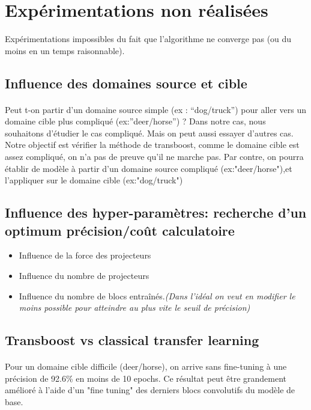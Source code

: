 \documentclass[11 pt]{article}
\begin{document}
\section{Expérimentations non réalisées}
Expérimentations impossibles du fait que l'algorithme ne converge pas (ou du moins en un temps raisonnable).
\subsection{Influence des domaines source et cible}
\paragraph{}Peut t-on partir d’un domaine source simple (ex : “dog/truck”) pour aller vers un domaine cible plus compliqué (ex:”deer/horse”) ? 
Dans notre cas, nous souhaitons d'étudier le cas compliqué. Mais on peut aussi essayer d'autres cas. Notre objectif est vérifier la méthode de transboost, comme le domaine cible est assez compliqué, on n'a pas de preuve qu'il ne marche pas. Par contre, on pourra établir de modèle à partir d'un domaine source compliqué (ex:"deer/horse"),et l'appliquer sur le domaine cible (ex:"dog/truck")
\subsection{Influence des hyper-paramètres: recherche d'un optimum précision/coût calculatoire}
\begin{itemize}
\item Influence de la force des projecteurs
\item Influence du nombre de projecteurs
\item Influence du nombre de blocs entraînés.\emph{(Dans l’idéal on veut en modifier le moins possible pour atteindre au plus vite le seuil de précision)}
\end{itemize}

\subsection{Transboost vs classical transfer learning}
\paragraph{}Pour un domaine cible difficile (deer/horse), on arrive sans fine-tuning à une précision de 92.6\% en moins de 10 epochs. Ce résultat peut être grandement amélioré à l'aide d'un "fine tuning" des derniers blocs convolutifs du modèle de base. 
\end{document}
